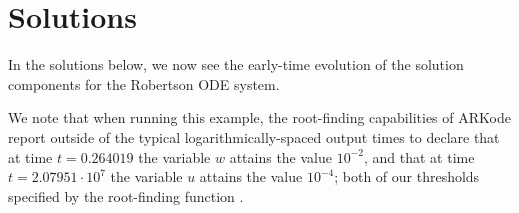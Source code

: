 \documentclass[letterpaper,10pt,english]{sphinxmanual}
\begin{document}
\section{Solutions}
\label{ark_robertson_root:solutions}
In the solutions below, we now see the early-time evolution of the
solution components for the Robertson ODE system.
\begin{figure}[htbp]
\centering

\end{figure}

We note that when running this example, the root-finding capabilities
of ARKode report outside of the typical logarithmically-spaced output
times to declare that at time $t=0.264019$ the variable
$w$ attains the value $10^{-2}$, and that at time
$t=2.07951\cdot10^{7}$ the variable $u$ attains the value
$10^{-4}$; both of our thresholds specified by the root-finding
function .
\end{document}
